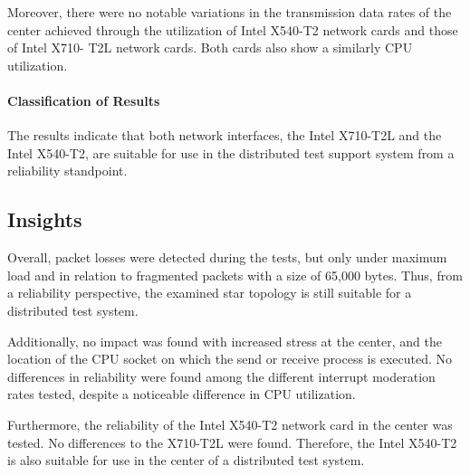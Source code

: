 Moreover, there were no notable variations in the transmission data rates of the center achieved through the utilization of Intel X540-T2 network cards and those of Intel X710- T2L network cards. Both cards also show a similarly CPU utilization.

\paragraph{Classification of Results}
The results indicate that both network interfaces, the Intel X710-T2L and the Intel X540-T2, are suitable for use in the distributed test support system from a reliability standpoint. 

\subsection{Insights}
Overall, packet losses were detected during the tests, but only under maximum load and in relation to fragmented packets with a size of 65,000 bytes. Thus, from a reliability perspective, the examined star topology is still suitable for a distributed test system.

Additionally, no impact was found with increased stress at the center, and the location of the CPU socket on which the send or receive process is executed. No differences in reliability were found among the different interrupt moderation rates tested, despite a noticeable difference in CPU utilization.

Furthermore, the reliability of the Intel X540-T2 network card in the center was tested. No differences to the X710-T2L were found. Therefore, the Intel X540-T2 is also suitable for use in the center of a distributed test system.








